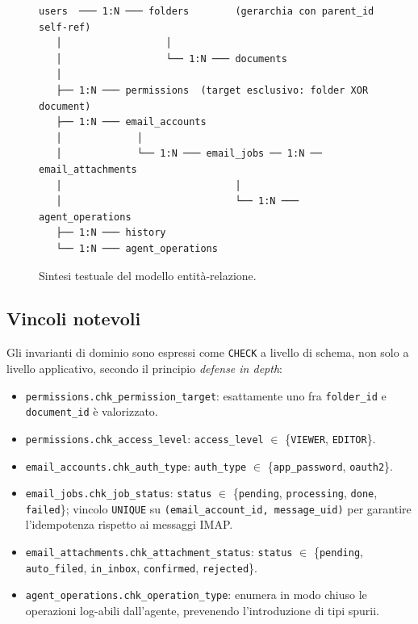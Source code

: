 \documentclass[11pt,a4paper,oneside]{article}
\begin{document}
\begin{figure}[ht]
\footnotesize
\begin{verbatim}
users  ─── 1:N ─── folders        (gerarchia con parent_id self-ref)
   │                  │
   │                  └── 1:N ─── documents
   │
   ├── 1:N ─── permissions  (target esclusivo: folder XOR document)
   ├── 1:N ─── email_accounts
   │             │
   │             └── 1:N ─── email_jobs ── 1:N ── email_attachments
   │                              │
   │                              └── 1:N ─── agent_operations
   ├── 1:N ─── history
   └── 1:N ─── agent_operations
\end{verbatim}
\caption{Sintesi testuale del modello entit\`a-relazione.}
\label{fig:erd-text}
\end{figure}

\subsection{Vincoli notevoli}
Gli invarianti di dominio sono espressi come \texttt{CHECK} a livello di schema,
non solo a livello applicativo, secondo il principio \emph{defense in depth}:
\begin{itemize}[leftmargin=*]
    \item \texttt{permissions.chk\_permission\_target}: esattamente uno fra
          \texttt{folder\_id} e \texttt{document\_id} \`e valorizzato.
    \item \texttt{permissions.chk\_access\_level}: \texttt{access\_level} $\in$
          \{\texttt{VIEWER}, \texttt{EDITOR}\}.
    \item \texttt{email\_accounts.chk\_auth\_type}: \texttt{auth\_type} $\in$
          \{\texttt{app\_password}, \texttt{oauth2}\}.
    \item \texttt{email\_jobs.chk\_job\_status}: \texttt{status} $\in$
          \{\texttt{pending}, \texttt{processing}, \texttt{done},
          \texttt{failed}\}; vincolo \texttt{UNIQUE} su
          \texttt{(email\_account\_id, message\_uid)} per garantire
          l'idempotenza rispetto ai messaggi IMAP.
    \item \texttt{email\_attachments.chk\_attachment\_status}: \texttt{status}
          $\in$ \{\texttt{pending}, \texttt{auto\_filed}, \texttt{in\_inbox},
          \texttt{confirmed}, \texttt{rejected}\}.
    \item \texttt{agent\_operations.chk\_operation\_type}: enumera in modo
          chiuso le operazioni log-abili dall'agente, prevenendo
          l'introduzione di tipi spurii.
\end{itemize}
\end{document}
